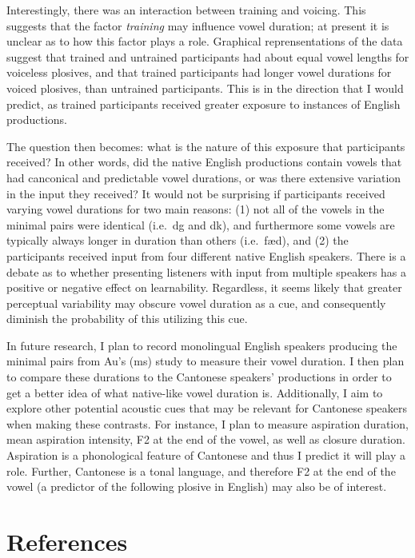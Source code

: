 \documentclass[man]{apa6}
\theoremstyle{definition}
\theoremstyle{definition}
\theoremstyle{definition}
\theoremstyle{remark}
\begin{document}
Interestingly, there was an interaction between training and voicing.
This suggests that the factor \emph{training} may influence vowel
duration; at present it is unclear as to how this factor plays a role.
Graphical reprensentations of the data suggest that trained and
untrained participants had about equal vowel lengths for voiceless
plosives, and that trained participants had longer vowel durations for
voiced plosives, than untrained participants. This is in the direction
that I would predict, as trained participants received greater exposure
to instances of English productions.

The question then becomes: what is the nature of this exposure that
participants received? In other words, did the native English
productions contain vowels that had canconical and predictable vowel
durations, or was there extensive variation in the input they received?
It would not be surprising if participants received varying vowel
durations for two main reasons: (1) not all of the vowels in the minimal
pairs were identical (i.e.~d\textopeno g and d\textscripta k), and
furthermore some vowels are typically always longer in duration than
others (i.e.~f\ae d), and (2) the participants received input from four
different native English speakers. There is a debate as to whether
presenting listeners with input from multiple speakers has a positive or
negative effect on learnability. Regardless, it seems likely that
greater perceptual variability may obscure vowel duration as a cue, and
consequently diminish the probability of this utilizing this cue.

In future research, I plan to record monolingual English speakers
producing the minimal pairs from Au's (ms) study to measure their vowel
duration. I then plan to compare these durations to the Cantonese
speakers' productions in order to get a better idea of what native-like
vowel duration is. Additionally, I aim to explore other potential
acoustic cues that may be relevant for Cantonese speakers when making
these contrasts. For instance, I plan to measure aspiration duration,
mean aspiration intensity, F2 at the end of the vowel, as well as
closure duration. Aspiration is a phonological feature of Cantonese and
thus I predict it will play a role. Further, Cantonese is a tonal
language, and therefore F2 at the end of the vowel (a predictor of the
following plosive in English) may also be of interest.

\newpage

\section{References}\label{references}
\end{document}
